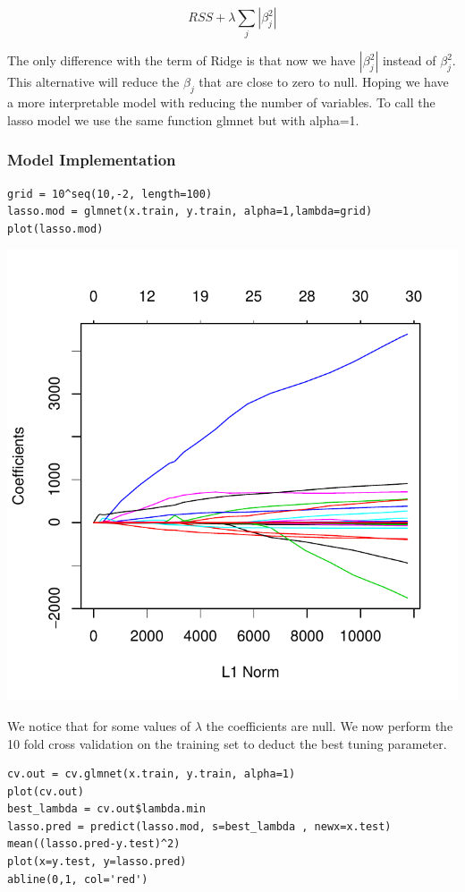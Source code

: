 \documentclass[]{report}
\begin{document}
\begin{equation} \label{eq2}
	RSS + \lambda \sum_{j}{|\beta_{j}^{2}|}
\end{equation}	

The only difference with the term of Ridge is that now we have $|\beta_{j}^{2}|$ instead of $\beta_{j}^{2}$. This alternative will reduce the $\beta_{j}$ that are close to zero to null.
Hoping we have a more interpretable model with reducing the number of variables. To call the lasso model we use the same function glmnet but with alpha=1.
 
\subsubsection{Model Implementation}
\begin{lstlisting}
grid = 10^seq(10,-2, length=100)
lasso.mod = glmnet(x.train, y.train, alpha=1,lambda=grid)
plot(lasso.mod)
\end{lstlisting}

\begin{center}
	\includegraphics[width=0.8\linewidth]{Figures/lasso_coeff.pdf}
\end{center}

We notice that for some values of $\lambda$ the coefficients are null. We now perform the 10 fold cross validation on the training set to deduct the best tuning parameter.

\begin{lstlisting}
cv.out = cv.glmnet(x.train, y.train, alpha=1)
plot(cv.out)
best_lambda = cv.out$lambda.min 
lasso.pred = predict(lasso.mod, s=best_lambda , newx=x.test)
mean((lasso.pred-y.test)^2)
plot(x=y.test, y=lasso.pred)
abline(0,1, col='red')
\end{lstlisting}
\end{document}
